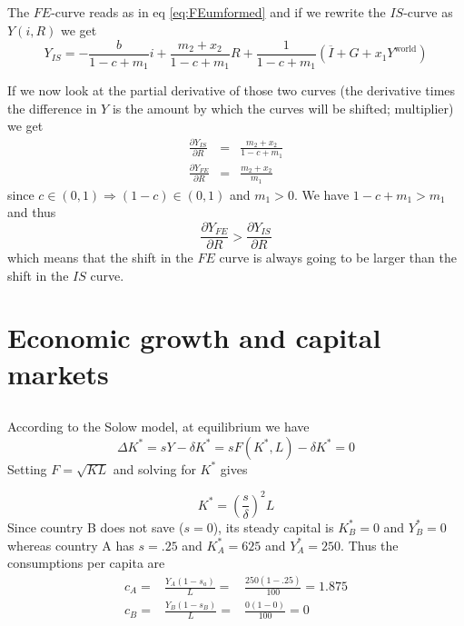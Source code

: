 \documentclass[a4paper] {scrartcl}
\begin{document}
\subsection{ }
\label{sec:14}
The $FE$-curve reads as in eq \ref{eq:FEumformed} and if we rewrite the $IS$-curve as $Y(i, R)$ we get
\begin{equation}
	Y_{IS} = -\frac{b}{1-c+m_1}i 
	+\frac{m_2+x_2}{1-c+m_1}R
	+\frac{1}{1-c+m_1}(\overline I+G+x_1Y^{\text{world}})
\end{equation}

If we now look at the partial derivative of those two curves (the derivative times the difference in $Y$ is the amount by which the curves will be shifted; multiplier) we get
\begin{eqnarray}
	\frac{\partial Y_{IS}}{\partial R}&=&\frac{m_2+x_2}{1-c+m_1}\\
	\frac{\partial Y_{FE}}{\partial R}&=&\frac{m_2+x_2}{m_1}
\end{eqnarray}
since $c\in(0,1) \Rightarrow(1-c)\in(0,1)$ and $m_1>0$. We have $1-c+m_1>m_1$ and thus 
\begin{equation}
	\frac{\partial Y_{FE}}{\partial R}
	>
	\frac{\partial Y_{IS}}{\partial R}
\end{equation}
which means that the shift in the $FE$ curve is always going to be larger than the shift in the $IS$ curve.


\section{Economic growth and capital markets}


\subsection{ }
According to the Solow model, at equilibrium we have
\begin{equation}
	\Delta K^* = sY -\delta K^* = sF(K^*,L) - \delta K^* = 0
\end{equation}
Setting $F=\sqrt{KL}$ and solving for $K^*$ gives

\begin{equation}
	K^* = \left(\frac{s}{\delta}\right)^2L 
\end{equation}
Since country B does not save ($s=0$), its steady capital is $K_B^*=0$ and $Y_B^*=0$ whereas country A has $s=.25$ and $K_A^*=625$ and $Y_A^*=250$.
Thus the consumptions per capita are
\begin{eqnarray}
	c_A =& \frac{Y_A(1-s_a)}{L} =& \frac{250(1-.25)}{100}=1.875\\
	c_B =& \frac{Y_B(1-s_B)}{L} =& \frac{0(1-0)}{100}=0
\end{eqnarray}
\end{document}
